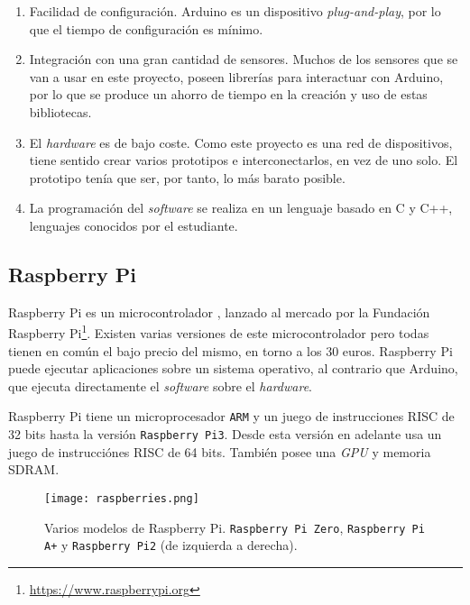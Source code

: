 \begin{enumerate}[]
\item Facilidad de configuración. Arduino es un dispositivo \textit{plug-and-play}, por lo que el tiempo de configuración es mínimo.
\item Integración con una gran cantidad de sensores. Muchos de los sensores que se van a usar en este proyecto, poseen librerías para interactuar con Arduino, por lo que se produce un ahorro de tiempo en la creación y uso de estas bibliotecas.
\item El \textit{hardware} es de bajo coste. Como este proyecto es una red de dispositivos, tiene sentido crear varios prototipos e interconectarlos, en vez de uno solo. El prototipo tenía que ser, por tanto, lo más barato posible.
\item La programación del \textit{software} se realiza en un lenguaje basado en C y C++, lenguajes conocidos por el estudiante. 
\end{enumerate}

\subsection{Raspberry Pi}

Raspberry Pi es un microcontrolador \cite{19}, lanzado al mercado por la Fundación Raspberry Pi\footnote{\url{https://www.raspberrypi.org}}. Existen varias versiones de este microcontrolador pero todas tienen en común el bajo precio del mismo, en torno a los 30 euros. Raspberry Pi puede ejecutar aplicaciones sobre un sistema operativo, al contrario que Arduino, que ejecuta directamente el \textit{software} sobre el \textit{hardware}. 

Raspberry Pi tiene un microprocesador \texttt{ARM} y un juego de instrucciones \ac{RISC} de 32 bits hasta la versión \texttt{Raspberry Pi3}. Desde esta versión en adelante usa un juego de instrucciónes \ac{RISC} de 64 bits. También posee una \textit{\ac{GPU}} y memoria \ac{SDRAM}.

\begin{figure}[!h]
\begin{center}
\texttt{[image: raspberries.png]}
\caption[]{Varios modelos de Raspberry Pi. \texttt{Raspberry Pi Zero}, \texttt{Raspberry Pi A+} y \texttt{Raspberry Pi2} (de izquierda a derecha). \protect\footnotemark}
\label{fig:raspberries}
\end{center}
\end{figure}



